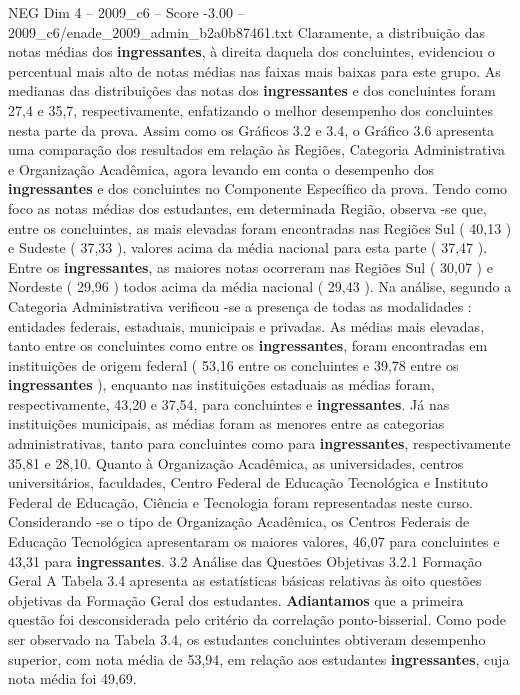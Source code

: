 \begin{textsample}{NEG Dim 4 – 2009\_c6 – Score -3.00 – 2009\_c6/enade\_2009\_admin\_b2a0b87461.txt}
Claramente, a distribuição das notas médias dos \textbf{ingressantes}, à direita daquela dos concluintes, evidenciou o percentual mais alto de notas médias nas faixas mais baixas para este grupo.
As medianas das distribuições das notas dos \textbf{ingressantes} e dos concluintes foram 27,4 e 35,7, respectivamente, enfatizando o melhor desempenho dos concluintes nesta parte da prova.
Assim como os Gráficos 3.2 e 3.4, o Gráfico 3.6 apresenta uma comparação dos resultados em relação às Regiões, Categoria Administrativa e Organização Acadêmica, agora levando em conta o desempenho dos \textbf{ingressantes} e dos concluintes no Componente Específico da prova.
Tendo como foco as notas médias dos estudantes, em determinada Região, observa -se que, entre os concluintes, as mais elevadas foram encontradas nas Regiões Sul ( 40,13 ) e Sudeste ( 37,33 ), valores acima da média nacional para esta parte ( 37,47 ).
Entre os \textbf{ingressantes}, as maiores notas ocorreram nas Regiões Sul ( 30,07 ) e Nordeste ( 29,96 ) todos acima da média nacional ( 29,43 ).
Na análise, segundo a Categoria Administrativa verificou -se a presença de todas as modalidades : entidades federais, estaduais, municipais e privadas.
As médias mais elevadas, tanto entre os concluintes como entre os \textbf{ingressantes}, foram encontradas em instituições de origem federal ( 53,16 entre os concluintes e 39,78 entre os \textbf{ingressantes} ), enquanto nas instituições estaduais as médias foram, respectivamente, 43,20 e 37,54, para concluintes e \textbf{ingressantes}.
Já nas instituições municipais, as médias foram as menores entre as categorias administrativas, tanto para concluintes como para \textbf{ingressantes}, respectivamente 35,81 e 28,10.
Quanto à Organização Acadêmica, as universidades, centros universitários, faculdades, Centro Federal de Educação Tecnológica e Instituto Federal de Educação, Ciência e Tecnologia foram representadas neste curso.
Considerando -se o tipo de Organização Acadêmica, os Centros Federais de Educação Tecnológica apresentaram os maiores valores, 46,07 para concluintes e 43,31 para \textbf{ingressantes}. 3.2 Análise das Questões Objetivas 3.2.1 Formação Geral A Tabela 3.4 apresenta as estatísticas básicas relativas às oito questões objetivas da Formação Geral dos estudantes. \textbf{Adiantamos} que a primeira questão foi desconsiderada pelo critério da correlação ponto-bisserial.
Como pode ser observado na Tabela 3.4, os estudantes concluintes obtiveram desempenho superior, com nota média de 53,94, em relação aos estudantes \textbf{ingressantes}, cuja nota média foi 49,69.

\end{textsample}

